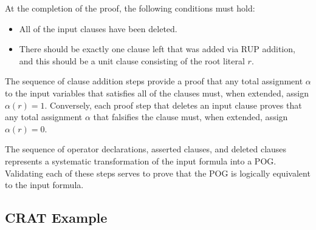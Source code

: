 \documentclass[letterpaper,USenglish,cleveref, autoref, thm-restate]{lipics-v2021}
\newcommand{\assign}{\alpha}
\begin{document}
At the completion of the proof, the following conditions must hold:
\begin{itemize}
\item All of the input clauses have been deleted.
\item There should be exactly one clause left that was added via RUP
  addition, and this should be a unit clause consisting of the root literal $r$.
\end{itemize}
The sequence of clause addition steps provide a proof that any
total assignment $\assign$ to the input variables that satisfies all of the
clauses must, when extended, assign $\assign(r) = 1$.  Conversely,
each proof step that deletes an input clause proves that any
total assignment $\alpha$ that falsifies the clause must, when extended,
assign $\assign(r) = 0$.

The sequence of operator declarations, asserted clauses, and deleted
clauses represents a systematic transformation of the input formula
into a POG\@.  Validating each of these steps serves to prove that the
POG is logically equivalent to the input formula.

\subsection{CRAT Example}
\end{document}
